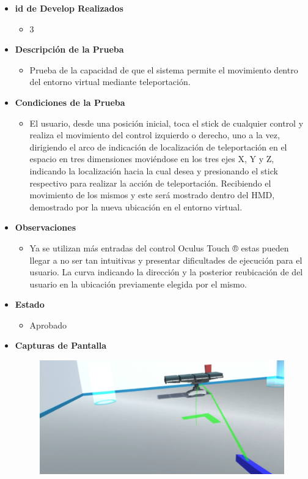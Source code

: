 \begin{itemize}
    \item \textbf{id de Develop Realizados}
    \begin{itemize}
        \item 3
    \end{itemize}
    \item \textbf{Descripción de la Prueba}
    \begin{itemize}
        \item Prueba de la capacidad de que el sistema permite el movimiento dentro del entorno virtual mediante teleportación.
    \end{itemize}
    \item \textbf{Condiciones de la Prueba}
    \begin{itemize}
        \item 
        El usuario, desde una posición inicial, toca el stick de cualquier control y realiza el movimiento del control izquierdo o derecho, uno a la vez, dirigiendo el arco de indicación de localización de teleportación en el espacio en tres dimensiones moviéndose en los tres ejes X, Y y Z, indicando la localización hacia la cual desea y presionando el stick respectivo para realizar la acción de teleportación. Recibiendo el movimiento de los mismos y este será mostrado dentro del HMD, demostrado por la nueva ubicación en el entorno virtual.\\        
    \end{itemize}
    \item \textbf{Observaciones}
    \begin{itemize}
        \item Ya se utilizan más entradas del control Oculus Touch ® estas pueden llegar a no ser tan intuitivas y presentar dificultades de ejecución para el usuario. La curva indicando la dirección y la posterior reubicación de del usuario en la ubicación previamente elegida por el mismo.
    \end{itemize}
    \item \textbf{Estado}
    \begin{itemize}
        \item Aprobado
    \end{itemize}
    \item \textbf{Capturas de Pantalla}
    \begin{figure}[H]
       	\begin{center}
       		\includegraphics[width = .7\textwidth]{source/images/image12.png}

\end{center}
\end{figure}
\end{itemize}

